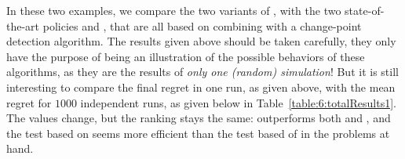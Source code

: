 

In these two examples, we compare the two variants of \GLRklUCB, with the two state-of-the-art policies \CUSUMklUCB{} and \MklUCB,
that are all based on combining \klUCB{} with a change-point detection algorithm.
The results given above should be taken carefully, they only have the purpose of being an illustration of the possible behaviors of these algorithms, as they are the results of \emph{only one (random) simulation}!
But it is still interesting to compare the final regret in one run, as given above, with the mean regret for $1000$ independent runs, as given below in Table~\ref{table:6:totalResults1}.
The values change, but the ranking stays the same: \GLRklUCB{} outperforms both \CUSUMklUCB{} and \MklUCB, and the test based on \CUSUM{} seems more efficient than the test based of \MklUCB{} in the problems at hand.


